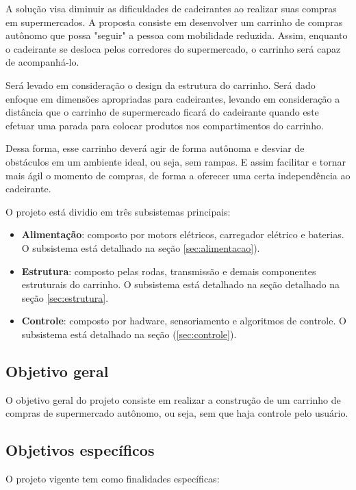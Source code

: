 A solução visa diminuir as dificuldades de cadeirantes ao realizar suas compras em supermercados. A proposta consiste em desenvolver um carrinho de compras autônomo que possa "seguir" a pessoa com mobilidade reduzida. Assim, enquanto o cadeirante se desloca pelos corredores do supermercado, o carrinho será capaz de acompanhá-lo.

Será levado em consideração o design da estrutura do carrinho. Será dado enfoque em dimensões apropriadas para cadeirantes, levando em consideração a distância que o carrinho de supermercado ficará do cadeirante quando este efetuar uma parada para colocar produtos nos compartimentos do carrinho.

Dessa forma, esse carrinho deverá agir de forma autônoma e desviar de obstáculos em um ambiente ideal, ou seja, sem rampas. E assim facilitar e tornar mais ágil o momento de compras, de forma a oferecer uma certa independência ao cadeirante.

O projeto está dividio em três subsistemas principais:

\begin{itemize}
    \item \textbf{Alimentação}: composto por motors elétricos, carregador elétrico e baterias. O subsistema está detalhado na seção \ref{sec:alimentacao}).
    \item \textbf{Estrutura}: composto pelas rodas, transmissão e demais componentes estruturais do carrinho. O subsistema está detalhado na seção detalhado na seção \ref{sec:estrutura}.
    \item \textbf{Controle}: composto por hadware, sensoriamento e algoritmos de controle. O subsistema está detalhado na seção (\ref{sec:controle}).
\end{itemize}

\subsection{Objetivo geral}

O objetivo geral do projeto consiste em realizar a construção de um carrinho de compras de supermercado autônomo, ou seja, sem que haja controle pelo usuário.

\subsection{Objetivos específicos}

O projeto vigente tem como finalidades específicas:

